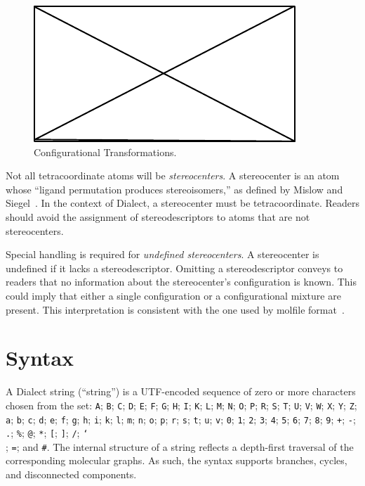 \documentclass{article}
\def\ttt{\texttt}
\begin{document}
\begin{figure}
    \centering
    \includegraphics{filler}
    \caption{Configurational Transformations.}
    \label{fig:iconfigurational-transformations}
\end{figure}

Not all tetracoordinate atoms will be \textit{stereocenters}. A stereocenter is an atom whose \enquote{ligand permutation produces stereoisomers,} as defined by Mislow and Siegel~\cite{mislow:1984}. In the context of Dialect, a stereocenter must be tetracoordinate. Readers should avoid the assignment of stereodescriptors to atoms that are not stereocenters.

Special handling is required for \textit{undefined stereocenters}. A stereocenter is undefined if it lacks a stereodescriptor. Omitting a stereodescriptor conveys to readers that no information about the stereocenter's configuration is known. This could imply that either a single configuration or a configurational mixture are present. This interpretation is consistent with the one used by molfile format~\cite{ctfileFormats}.

\section*{Syntax}

A Dialect string (\enquote{string}) is a UTF-encoded sequence of zero or more characters chosen from the set: \ttt{A}; \ttt{B}; \ttt{C}; \ttt{D}; \ttt{E}; \ttt{F}; \ttt{G}; \ttt{H}; \ttt{I}; \ttt{K}; \ttt{L}; \ttt{M}; \ttt{N}; \ttt{O}; \ttt{P}; \ttt{R}; \ttt{S}; \ttt{T}; \ttt{U}; \ttt{V}; \ttt{W}; \ttt{X}; \ttt{Y}; \ttt{Z}; \ttt{a}; \ttt{b}; \ttt{c}; \ttt{d}; \ttt{e}; \ttt{f}; \ttt{g}; \ttt{h}; \ttt{i}; \ttt{k}; \ttt{l}; \ttt{m}; \ttt{n}; \ttt{o}; \ttt{p}; \ttt{r}; \ttt{s}; \ttt{t}; \ttt{u}; \ttt{v}; \ttt{0}; \ttt{1}; \ttt{2}; \ttt{3}; \ttt{4}; \ttt{5}; \ttt{6}; \ttt{7}; \ttt{8}; \ttt{9}; \ttt{+}; \ttt{-}; \ttt{.}; \ttt{\%}; \ttt{@}; \ttt{*}; \ttt{[}; \ttt{]}; \ttt{/}; \ttt{\char`\\}; \ttt{=}; and \ttt{\#}. The internal structure of a string reflects a depth-first traversal of the corresponding molecular graphs. As such, the syntax supports branches, cycles, and disconnected components.
\end{document}

